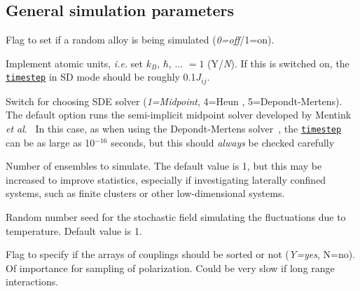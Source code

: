 \documentclass[11pt,fleqn,a4]{book} %
\makeatletter
\newcommand{\litem}[1]{\item[\bfseries#1\index{#1@\texttt{#1}}\label{#1}]}
\newcommand{\rkeyword}[1]{\hyperref[#1]{\texttt{#1}}}
\makeatother
\begin{document}
\subsection{General simulation parameters}
\begin{description}[leftmargin=!,labelwidth=\widthof{\bfseries fifteenchars}]
\litem{do_ralloy} Flag to set if a random alloy is being simulated (\emph{0=off}/1=on). 
\litem{aunits} Implement atomic units, \textit{i.e.} set $k_B$, $\hbar$, ... $=1$ (Y/\emph{N}). If this is switched on, the \rkeyword{timestep} in SD mode should be roughly 0.1$J_{ij}$. 
\litem{sdealgh} Switch for choosing SDE solver (\emph{1=Midpoint}, 4=Heun , 5=Depondt-Mertens). The default option runs the semi-implicit midpoint solver developed by Mentink \textit{et al}.~\cite{Mentink2010} In this case, as when using the Depondt-Mertens solver~\cite{Depondt2009}, the \rkeyword{timestep} can be as large as  10$^{-16}$ seconds, but this should \textit{always} be checked carefully 
\litem{mensemble} Number of ensembles to simulate. The default value is 1, but this may be increased to improve statistics, especially if investigating laterally confined systems, such as finite clusters or other low-dimensional systems.
\litem{tseed} Random number seed for the stochastic field simulating the fluctuations due to temperature. Default value is 1. 
\litem{do_sortcoup} Flag to specify if the arrays of couplings should be sorted or not (\emph{Y=yes}, N=no). Of importance for sampling of polarization. Could be very slow if long range interactions.
\end{description}
\end{document}
